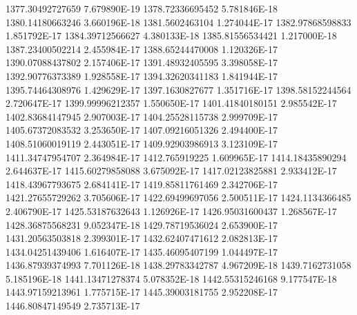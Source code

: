 1377.30492727659  7.679890E-19
1378.72336695452  5.781846E-18
1380.14180663246  3.660196E-18
1381.5602463104  1.274044E-17
1382.97868598833  1.851792E-17
1384.39712566627  4.380133E-18
1385.81556534421  1.217000E-18
1387.23400502214  2.455984E-17
1388.65244470008  1.120326E-17
1390.07088437802  2.157406E-17
1391.48932405595  3.398058E-17
1392.90776373389  1.928558E-17
1394.32620341183  1.841944E-17
1395.74464308976  1.429629E-17
1397.1630827677  1.351716E-17
1398.58152244564  2.720647E-17
1399.99996212357  1.550650E-17
1401.41840180151  2.985542E-17
1402.83684147945  2.907003E-17
1404.25528115738  2.999709E-17
1405.67372083532  3.253650E-17
1407.09216051326  2.494400E-17
1408.51060019119  2.443051E-17
1409.92903986913  3.123109E-17
1411.34747954707  2.364984E-17
1412.765919225  1.609965E-17
1414.18435890294  2.644637E-17
1415.60279858088  3.675092E-17
1417.02123825881  2.933412E-17
1418.43967793675  2.684141E-17
1419.85811761469  2.342706E-17
1421.27655729262  3.705606E-17
1422.69499697056  2.500511E-17
1424.1134366485  2.406790E-17
1425.53187632643  1.126926E-17
1426.95031600437  1.268567E-17
1428.36875568231  9.052347E-18
1429.78719536024  2.653900E-17
1431.20563503818  2.399301E-17
1432.62407471612  2.082813E-17
1434.04251439406  1.616407E-17
1435.46095407199  1.044497E-17
1436.87939374993  7.701126E-18
1438.29783342787  4.967209E-18
1439.7162731058  5.185196E-18
1441.13471278374  5.078352E-18
1442.55315246168  9.177547E-18
1443.97159213961  1.775715E-17
1445.39003181755  2.952208E-17
1446.80847149549  2.735713E-17
